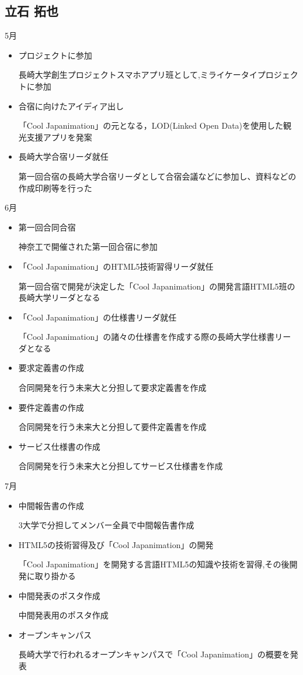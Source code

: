 \subsection{立石 拓也}
5月
\begin{itemize}
\item プロジェクトに参加
\par 長崎大学創生プロジェクトスマホアプリ班として,ミライケータイプロジェクトに参加
\item 合宿に向けたアイディア出し
\par 「Cool Japanimation」の元となる，LOD(Linked Open Data)を使用した観光支援アプリを発案
\item 長崎大学合宿リーダ就任
\par 第一回合宿の長崎大学合宿リーダとして合宿会議などに参加し、資料などの作成印刷等を行った
\end{itemize}
6月
\begin{itemize}
\item 第一回合同合宿
\par 神奈工で開催された第一回合宿に参加
\item 「Cool Japanimation」のHTML5技術習得リーダ就任
\par 第一回合宿で開発が決定した「Cool Japanimation」の開発言語HTML5班の長崎大学リーダとなる
\item 「Cool Japanimation」の仕様書リーダ就任
\par 「Cool Japanimation」の諸々の仕様書を作成する際の長崎大学仕様書リーダとなる
\item 要求定義書の作成
\par 合同開発を行う未来大と分担して要求定義書を作成
\item 要件定義書の作成
\par 合同開発を行う未来大と分担して要件定義書を作成
\item サービス仕様書の作成
\par 合同開発を行う未来大と分担してサービス仕様書を作成
\end{itemize}
7月
\begin{itemize}
\item 中間報告書の作成
\par 3大学で分担してメンバー全員で中間報告書作成
\item HTML5の技術習得及び「Cool Japanimation」の開発
\par 「Cool Japanimation」を開発する言語HTML5の知識や技術を習得,その後開発に取り掛かる
\item 中間発表のポスタ作成
\par 中間発表用のポスタ作成
\item オープンキャンパス
\par 長崎大学で行われるオープンキャンパスで「Cool Japanimation」の概要を発表
\end{itemize}
